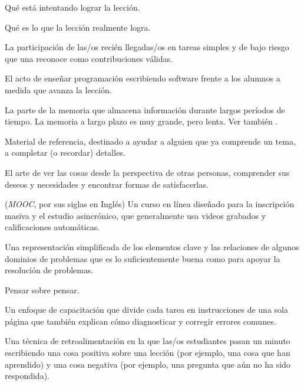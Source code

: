 \begin{description}
 Qué está intentando lograr la lección.

 Qué es lo que la lección realmente logra.

 La participación de las/os recién llegadas/os en tareas simples y de bajo riesgo que una  
 reconoce como contribuciones válidas.

 El acto de enseñar programación 
escribiendo software frente a los alumnos a medida que avanza la lección.

 La parte de la memoria que 
almacena información durante largos períodos de tiempo. La memoria a largo plazo es muy grande, 
pero lenta. Ver también .

 Material de referencia, destinado a ayudar a alguien que ya comprende un tema, a completar (o recordar) detalles.

 El arte de ver las cosas desde la perspectiva 
de otras personas, comprender sus deseos y necesidades y encontrar formas de satisfacerlas.


 (\emph{MOOC}, por sus siglas en Inglés) Un curso en línea diseñado para la inscripción masiva y el estudio asincrónico, que generalmente usa videos grabados y calificaciones automáticas.

 Una representación simplificada 
de los elementos clave y las relaciones de algunos dominios de problemas que es 
lo suficientemente buena como para apoyar la resolución de problemas.

 Pensar sobre pensar.

 Un enfoque de capacitación que divide 
cada tarea en instrucciones de una sola página que también 
explican cómo diagnosticar y corregir errores comunes.

 Una técnica de retroalimentación en la 
que las/os estudiantes pasan un minuto escribiendo una cosa positiva sobre una lección 
(por ejemplo, una cosa que han aprendido) y una cosa negativa (por ejemplo, una pregunta que aún no ha sido respondida).


\end{description}
